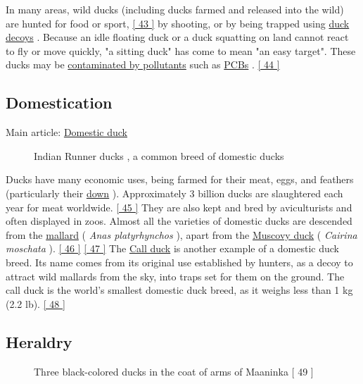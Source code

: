 \documentclass[11pt,a4paper]{article}
\begin{document}
In many areas, wild ducks (including ducks farmed and released into the wild) are hunted for food or sport, \href{\#cite\_note-43}{[ 43 ]} by shooting, or by being trapped using \href{/wiki/Duck\_decoy\_\%28structure\%29}{duck decoys} . Because an idle floating duck or a duck squatting on land cannot react to fly or move quickly, "a sitting duck" has come to mean "an easy target". These ducks may be \href{/wiki/Duck\_\%28food\%29\#Pollution}{contaminated by pollutants} such as \href{/wiki/Polychlorinated\_biphenyl}{PCBs} . \href{\#cite\_note-44}{[ 44 ]}

\subsection{Domestication}

Main article: \href{/wiki/Domestic\_duck}{Domestic duck}

\begin{figure}[h]
\caption{Indian Runner ducks , a common breed of domestic ducks}
\end{figure}

Ducks have many economic uses, being farmed for their meat, eggs, and feathers (particularly their \href{/wiki/Down\_feather}{down} ). Approximately 3 billion ducks are slaughtered each year for meat worldwide. \href{\#cite\_note-45}{[ 45 ]} They are also kept and bred by aviculturists and often displayed in zoos. Almost all the varieties of domestic ducks are descended from the \href{/wiki/Mallard}{mallard} ( \textit{Anas platyrhynchos} ), apart from the \href{/wiki/Muscovy\_duck}{Muscovy duck} ( \textit{Cairina moschata} ). \href{\#cite\_note-46}{[ 46 ]} \href{\#cite\_note-47}{[ 47 ]} The \href{/wiki/Call\_duck}{Call duck} is another example of a domestic duck breed. Its name comes from its original use established by hunters, as a decoy to attract wild mallards from the sky, into traps set for them on the ground. The call duck is the world's smallest domestic duck breed, as it weighs less than 1 kg (2.2 lb). \href{\#cite\_note-48}{[ 48 ]}

\subsection{Heraldry}

\begin{figure}[h]
\caption{Three black-colored ducks in the coat of arms of Maaninka [ 49 ]}
\end{figure}
\end{document}
